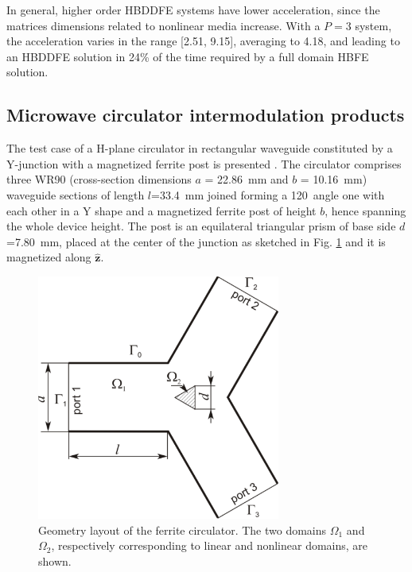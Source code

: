In general, higher order HBDDFE systems have lower acceleration, since the
matrices dimensions related to nonlinear media increase. With a
$P=3$ system, the acceleration varies in the range [2.51,
9.15], averaging to 4.18, and leading to an HBDDFE solution in 24\% of the
time required by a full domain HBFE solution.

\subsection{Microwave circulator intermodulation products}


The test case of a H-plane circulator in rectangular waveguide constituted by a Y-junction with a magnetized ferrite post is presented \cite{koshiba1986finite}. The circulator comprises three WR90 (cross-section dimensions $a$ = 22.86~mm and $b$ = 10.16~mm) waveguide sections of length $l$=33.4~mm joined forming a 120\textdegree~angle one with each other in a Y shape and a magnetized ferrite post of height $b$, hence spanning the whole device height. The post is an equilateral triangular prism of base side $d$=7.80~mm, placed at the center of the junction as sketched in Fig. \ref{fig:Koshiba} and it is magnetized along $\hat{\mathbf{z}}$.

\begin{figure}[!ht]
\centering
\includegraphics[width=8cm]{Koshiba}
\caption{Geometry layout of the ferrite circulator. The two domains $\Omega_1$ and $\Omega_2$, respectively corresponding to linear and nonlinear domains, are shown.}
\label{fig:Koshiba}
\end{figure}
 

